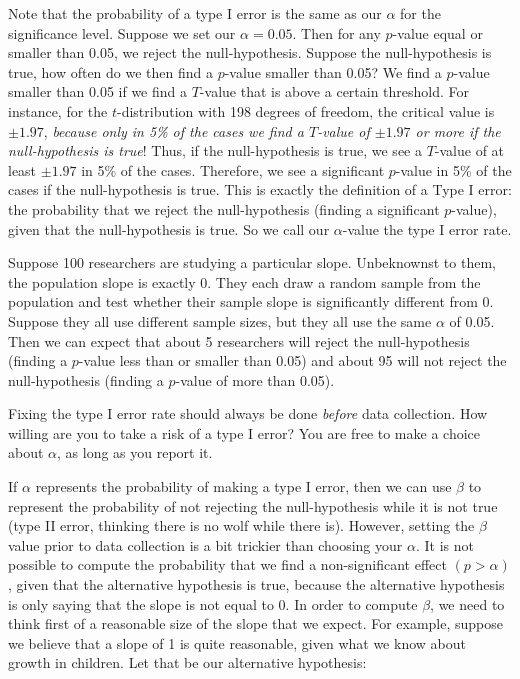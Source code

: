 \documentclass[]{book}\usepackage[]{graphicx}\usepackage[]{color}
\begin{document}
Note that the probability of a type I error is the same as our $\alpha$ for the significance level. Suppose we set our $\alpha=0.05$. Then for any $p$-value equal or smaller than 0.05, we reject the null-hypothesis. Suppose the null-hypothesis is true, how often do we then find a $p$-value smaller than 0.05? We find a $p$-value smaller than 0.05 if we find a $T$-value that is above a certain threshold. For instance, for the $t$-distribution with 198 degrees of freedom, the critical value is $\pm 1.97$, \textit{because only in 5\% of the cases we find a $T$-value of $\pm 1.97$ or more if the null-hypothesis is true}! Thus, if the null-hypothesis is true, we see a $T$-value of at least $\pm 1.97$ in 5\% of the cases. Therefore, we see a significant $p$-value in 5\% of the cases if the null-hypothesis is true. This is exactly the definition of a Type I error: the probability that we reject the null-hypothesis (finding a significant $p$-value), given that the null-hypothesis is true. So we call our $\alpha$-value the type I error rate.




Suppose 100 researchers are studying a particular slope. Unbeknownst to them, the population slope is exactly 0. They each draw a random sample from the population and test whether their sample slope is significantly different from 0. Suppose they all use different sample sizes, but they all use the same $\alpha$ of 0.05. Then we can expect that about 5 researchers will reject the null-hypothesis (finding a $p$-value less than or smaller than 0.05) and about 95 will not reject the null-hypothesis (finding a $p$-value of more than 0.05).

Fixing the type I error rate should always be done \textit{before} data collection. How willing are you to take a risk of a type I error? You are free to make a choice about $\alpha$, as long as you report it.

If $\alpha$ represents the probability of making a type I error, then we can use $\beta$ to represent the probability of not rejecting the null-hypothesis while it is not true (type II error, thinking there is no wolf while there is). However, setting the $\beta$ value prior to data collection is a bit trickier than choosing your $\alpha$. It is not possible to compute the probability that we find a non-significant effect $(p > \alpha)$, given that the alternative hypothesis is true, because the alternative hypothesis is only saying that the slope is not equal to 0. In order to compute $\beta$, we need to think first of a reasonable size of the slope that we expect. For example, suppose we believe that a slope of 1 is quite reasonable, given what we know about growth in children. Let that be our alternative hypothesis:
\end{document}
